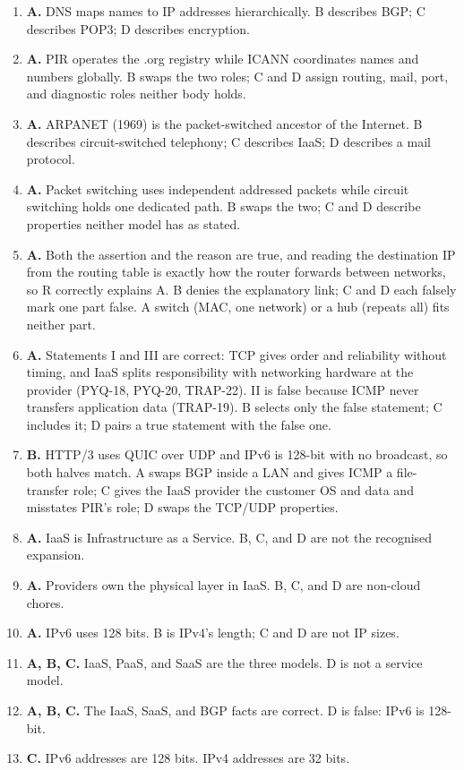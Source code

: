 \begin{enumerate}[label=\textbf{Q\arabic*.}, leftmargin=*]
  correct expansion.
\item \textbf{A.} DNS maps names to IP addresses hierarchically. B describes
  BGP; C describes POP3; D describes encryption.
\item \textbf{A.} PIR operates the .org registry while ICANN coordinates
  names and numbers globally. B swaps the two roles; C and D assign routing,
  mail, port, and diagnostic roles neither body holds.
\item \textbf{A.} ARPANET (1969) is the packet-switched ancestor of the
  Internet. B describes circuit-switched telephony; C describes IaaS; D
  describes a mail protocol.
\item \textbf{A.} Packet switching uses independent addressed packets while
  circuit switching holds one dedicated path. B swaps the two; C and D
  describe properties neither model has as stated.
\item \textbf{A.} Both the assertion and the reason are true, and reading the
  destination IP from the routing table is exactly how the router forwards
  between networks, so R correctly explains A. B denies the explanatory link;
  C and D each falsely mark one part false. A switch (MAC, one network) or a
  hub (repeats all) fits neither part.
\item \textbf{A.} Statements I and III are correct: TCP gives order and
  reliability without timing, and IaaS splits responsibility with networking
  hardware at the provider (PYQ-18, PYQ-20, TRAP-22). II is false because
  ICMP never transfers application data (TRAP-19). B selects only the false
  statement; C includes it; D pairs a true statement with the false one.
\item \textbf{B.} HTTP/3 uses QUIC over UDP and IPv6 is 128-bit with no
  broadcast, so both halves match. A swaps BGP inside a LAN and gives ICMP a
  file-transfer role; C gives the IaaS provider the customer OS and data and
  misstates PIR's role; D swaps the TCP/UDP properties.

\item \textbf{A.} IaaS is Infrastructure as a Service. B, C, and D are not the recognised expansion.
\item \textbf{A.} Providers own the physical layer in IaaS. B, C, and D are non-cloud chores.
\item \textbf{A.} IPv6 uses 128 bits. B is IPv4's length; C and D are not IP sizes.
\item \textbf{A, B, C.} IaaS, PaaS, and SaaS are the three models. D is not a service model.
\item \textbf{A, B, C.} The IaaS, SaaS, and BGP facts are correct. D is false: IPv6 is 128-bit.
\item \textbf{C.} IPv6 addresses are 128 bits. IPv4 addresses are 32 bits.


\end{enumerate}
